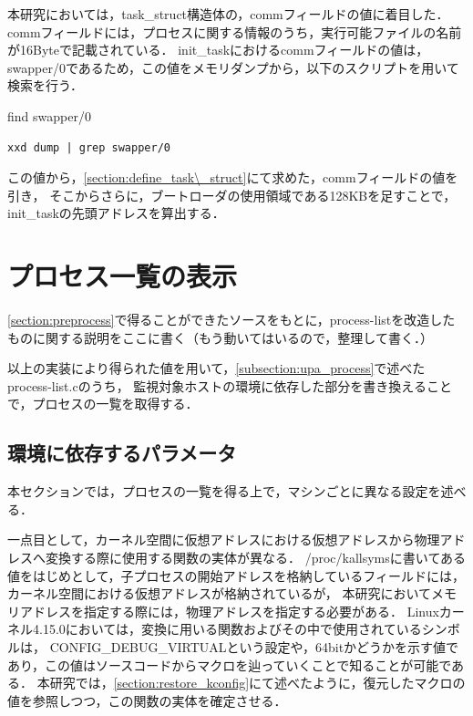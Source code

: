 本研究においては，task\_struct構造体の，commフィールドの値に着目した．
commフィールドには，プロセスに関する情報のうち，実行可能ファイルの名前が16Byteで記載されている．
init_taskにおけるcommフィールドの値は，swapper/0であるため，この値をメモリダンプから，以下のスクリプトを用いて検索を行う．

\begin{itembox}[l]{find swapper/0}
    \begin{verbatim}
xxd dump | grep swapper/0
    \end{verbatim}
\end{itembox}

この値から，\ref{section:define_task\_struct}にて求めた，commフィールドの値を引き，
そこからさらに，ブートローダの使用領域である128KBを足すことで，init_taskの先頭アドレスを算出する．



\section{プロセス一覧の表示}
\label{subsection:process-list}

\ref{section:preprocess}で得ることができたソースをもとに，process-listを改造したものに関する説明をここに書く（もう動いてはいるので，整理して書く．）

以上の実装により得られた値を用いて，\ref{subsection:upa_process}で述べたprocess-list.cのうち，
監視対象ホストの環境に依存した部分を書き換えることで，プロセスの一覧を取得する．

\subsection{環境に依存するパラメータ}

本セクションでは，プロセスの一覧を得る上で，マシンごとに異なる設定を述べる．

一点目として，カーネル空間に仮想アドレスにおける仮想アドレスから物理アドレスへ変換する際に使用する関数の実体が異なる．
/proc/kallsymsに書いてある値をはじめとして，子プロセスの開始アドレスを格納しているフィールドには，カーネル空間における仮想アドレスが格納されているが，
本研究においてメモリアドレスを指定する際には，物理アドレスを指定する必要がある．
Linuxカーネル4.15.0においては，変換に用いる関数およびその中で使用されているシンボルは，
CONFIG_DEBUG_VIRTUALという設定や，64bitかどうかを示す値であり，この値はソースコードからマクロを辿っていくことで知ることが可能である．
本研究では，\ref{section:restore_kconfig}にて述べたように，復元したマクロの値を参照しつつ，この関数の実体を確定させる．

